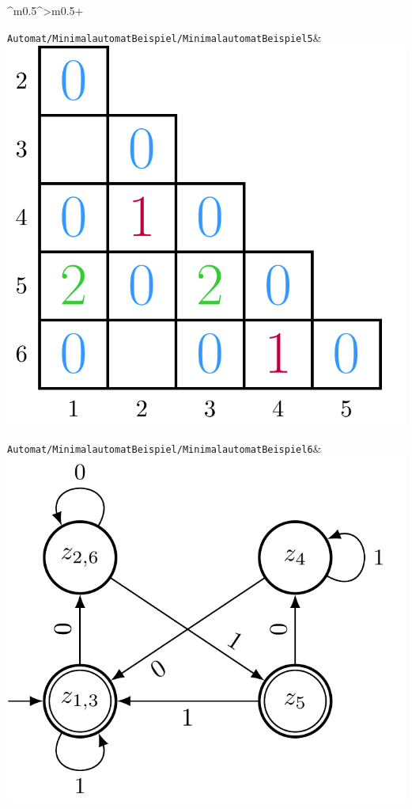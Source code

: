 \documentclass[PLAIN]{Lilly}
\begin{document}
\begin{tabularx}{\linewidth}{^m{0.5\linewidth}^>{\centering\arraybackslash}m{0.5\linewidth}+}
\midrule {} {}\verb|Automat/MinimalautomatBeispiel/MinimalautomatBeispiel5|& \includegraphics[width=0.8\linewidth]{Automat/MinimalautomatBeispiel/MinimalautomatBeispiel5-pdf.pdf}\\
\midrule {} {}\verb|Automat/MinimalautomatBeispiel/MinimalautomatBeispiel6|& \includegraphics[width=0.8\linewidth]{Automat/MinimalautomatBeispiel/MinimalautomatBeispiel6-pdf.pdf}\\

\end{tabularx}
\end{document}
